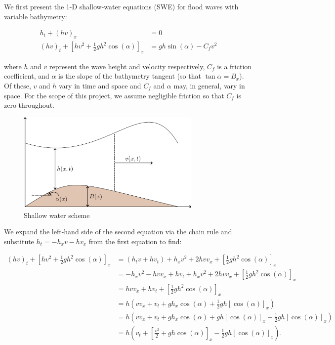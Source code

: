 We first present the 1-D shallow-water equations (SWE) for flood waves with variable bathymetry\cite{whitham1999_ch3}:

\begin{align*}
    h_t + (h v)_x &= 0 \\
    (h v)_t + \left[ hv^2 + \frac{1}{2} g h^2 \cos{(\alpha)} \right]_x &= g h \sin{(\alpha)} - C_f v^2
\end{align*}

where $h$ and $v$ represent the wave height and velocity respectively, $C_f$ is a friction coefficient, and $\alpha$
is the slope of the bathymetry tangent (so that $\tan{\alpha} = B_x$). Of these, $v$ and $h$ vary in time and space and 
$C_f$ and $\alpha$ may, in general, vary in space. For the scope of this project, we assume negligible friction so that 
$C_f$ is zero throughout. 

\begin{figure}[h]
    \centering
    \includegraphics[width=0.8\textwidth]{images/swe_diagram.png}
    \caption{Shallow water scheme}
\end{figure}

\pagebreak
We expand the left-hand side of the second equation via the
chain rule and substitute $h_t = -h_x v - h v_x$ from the first equation to find: 

\begin{align*}
    (h v)_t + \left[ hv^2 + \frac{1}{2} g h^2 \cos{(\alpha)} \right]_x 
        &= \left( h_t v + h v_t \right) + h_x v^2 + 2 h v v_x + \left[ \frac{1}{2} g h^2 \cos{(\alpha)} \right]_x \\
        &= -h_x v^2 - h v v_x + h v_t + h_x v^2 + 2 h v v_x + \left[ \frac{1}{2} g h^2 \cos{(\alpha)} \right]_x \\
        &=  h v v_x + h v_t + \left[ \frac{1}{2} g h^2 \cos{(\alpha)} \right]_x \\
        &=  h \left( v v_x + v_t + g h_x \cos{(\alpha)} + \frac{1}{2} g h [\cos{(\alpha)}]_x \right) \\
        &=  h \left( v v_x + v_t + g h_x \cos{(\alpha)} + g h [\cos{(\alpha)}]_x - \frac{1}{2} g h [\cos{(\alpha)}]_x \right) \\
        &=  h \left( v_t + \left[ \frac{v^2}{2} + g h \cos{(\alpha)} \right]_x - \frac{1}{2} g h [\cos{(\alpha)}]_x \right).
\end{align*}

